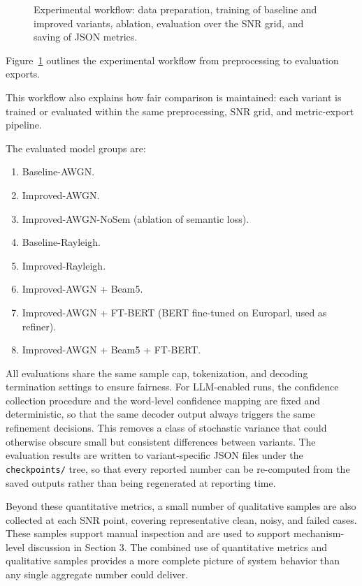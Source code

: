 \begin{figure}[!htb]
\centering
{}
\caption{Experimental workflow: data preparation, training of baseline and improved variants, ablation, evaluation over the SNR grid, and saving of JSON metrics.}
\label{fig:workflow}
\end{figure}
Figure~\ref{fig:workflow} outlines the experimental workflow from preprocessing to evaluation exports.

This workflow also explains how fair comparison is maintained: each variant is trained or evaluated within the same preprocessing, SNR grid, and metric-export pipeline.

The evaluated model groups are:
\begin{enumerate}
    \item Baseline-AWGN.
    \item Improved-AWGN.
    \item Improved-AWGN-NoSem (ablation of semantic loss).
    \item Baseline-Rayleigh.
    \item Improved-Rayleigh.
    \item Improved-AWGN + Beam5.
    \item Improved-AWGN + FT-BERT (BERT fine-tuned on Europarl, used as refiner).
    \item Improved-AWGN + Beam5 + FT-BERT.
\end{enumerate}

All evaluations share the same sample cap, tokenization, and decoding termination settings to ensure fairness. For LLM-enabled runs, the confidence collection procedure and the word-level confidence mapping are fixed and deterministic, so that the same decoder output always triggers the same refinement decisions. This removes a class of stochastic variance that could otherwise obscure small but consistent differences between variants. The evaluation results are written to variant-specific JSON files under the \texttt{checkpoints/} tree, so that every reported number can be re-computed from the saved outputs rather than being regenerated at reporting time.

Beyond these quantitative metrics, a small number of qualitative samples are also collected at each SNR point, covering representative clean, noisy, and failed cases. These samples support manual inspection and are used to support mechanism-level discussion in Section 3. The combined use of quantitative metrics and qualitative samples provides a more complete picture of system behavior than any single aggregate number could deliver.

